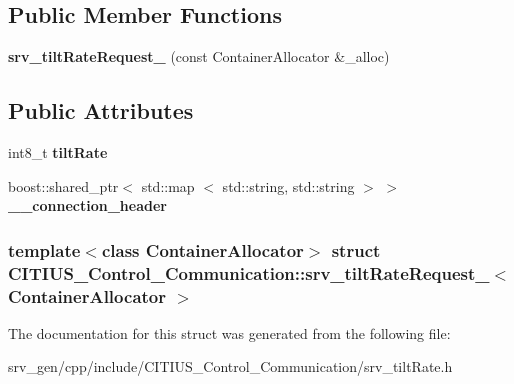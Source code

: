 \subsection*{\-Public \-Member \-Functions}
\begin{DoxyCompactItemize}
\item 
\hypertarget{struct_c_i_t_i_u_s___control___communication_1_1srv__tilt_rate_request___a0db2caea35397703f1e0926ae1564d50}{{\bfseries srv\-\_\-tilt\-Rate\-Request\-\_\-} (const \-Container\-Allocator \&\-\_\-alloc)}\label{struct_c_i_t_i_u_s___control___communication_1_1srv__tilt_rate_request___a0db2caea35397703f1e0926ae1564d50}

\end{DoxyCompactItemize}
\subsection*{\-Public \-Attributes}
\begin{DoxyCompactItemize}
\item 
\hypertarget{struct_c_i_t_i_u_s___control___communication_1_1srv__tilt_rate_request___a64eba0b7d5f0270861fc9fa566baa003}{int8\-\_\-t {\bfseries tilt\-Rate}}\label{struct_c_i_t_i_u_s___control___communication_1_1srv__tilt_rate_request___a64eba0b7d5f0270861fc9fa566baa003}

\item 
\hypertarget{struct_c_i_t_i_u_s___control___communication_1_1srv__tilt_rate_request___ad2302f723d0e279dca984bb99eafb312}{boost\-::shared\-\_\-ptr$<$ std\-::map\*
$<$ std\-::string, std\-::string $>$ $>$ {\bfseries \-\_\-\-\_\-connection\-\_\-header}}\label{struct_c_i_t_i_u_s___control___communication_1_1srv__tilt_rate_request___ad2302f723d0e279dca984bb99eafb312}

\end{DoxyCompactItemize}
\subsubsection*{template$<$class Container\-Allocator$>$ struct C\-I\-T\-I\-U\-S\-\_\-\-Control\-\_\-\-Communication\-::srv\-\_\-tilt\-Rate\-Request\-\_\-$<$ Container\-Allocator $>$}



\-The documentation for this struct was generated from the following file\-:\begin{DoxyCompactItemize}
\item 
srv\-\_\-gen/cpp/include/\-C\-I\-T\-I\-U\-S\-\_\-\-Control\-\_\-\-Communication/srv\-\_\-tilt\-Rate.\-h\end{DoxyCompactItemize}
